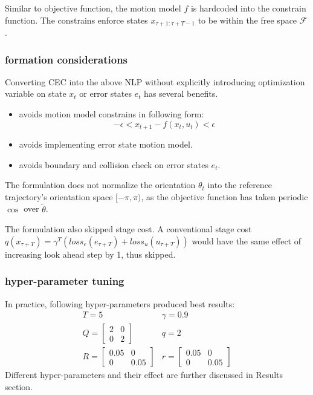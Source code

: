 \documentclass[conference]{IEEEtran}
\begin{document}
Similar to objective function, the motion model $f$ is hardcoded into the constrain function.
The constrains enforce states $x_{\tau+1:\tau+T-1}$ to be within the free space $\mathcal{F}$.

\subsubsection{formation considerations}
Converting CEC into the above NLP without explicitly introducing 
optimization variable on state $x_t$ or error states $e_t$ has several benefits.
\begin{itemize}
    \item avoids motion model constrains in following form: 
    \[-\epsilon < x_{t+1} - f(x_t, u_t) <\epsilon\]
    \item avoids implementing error state motion model.
    \item avoids boundary and collision check on error states $e_t$.
    \end{itemize}

The formulation does not normalize the orientation $\theta_t$ into the reference trajectory's orientation space $[-\pi, \pi)$,
as the objective function has taken periodic $\cos$ over $\tilde{\theta}$.

The formulation also skipped stage cost.
A conventional stage cost $q(x_{\tau+T}) = \gamma^T (loss_e(e_{\tau+T}) + loss_u(u_{\tau+T}))$
would have the same effect of increasing look ahead step by 1, thus skipped.

\subsubsection{hyper-parameter tuning}
In practice, following hyper-parameters produced best results:
\[
\begin{array}{ll}
    T=5
    &\gamma = 0.9\\ 
    Q=\left[ \begin{matrix}2&0\\ 0&2\end{matrix}  \right] 
    &q=2\\ 
    R=\left[ \begin{matrix}0.05&0\\ 0&0.05\end{matrix}  \right] 
    &r=\left[ \begin{matrix}0.05&0\\ 0&0.05\end{matrix}  \right] 
\end{array} 
\]
Different hyper-parameters and their effect are further discussed in Results section.
\end{document}

